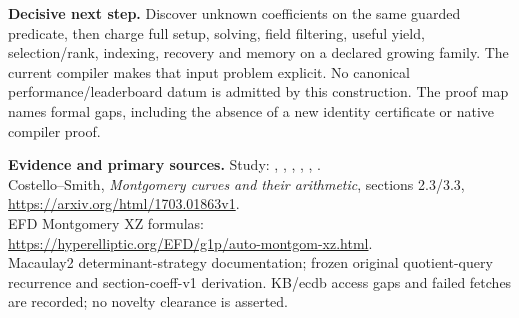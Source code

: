 \documentclass[10pt,a4paper]{article}
\begin{document}
\textbf{Decisive next step.}
Discover unknown coefficients on the same guarded predicate, then charge full
setup, solving, field filtering, useful yield, selection/rank, indexing,
recovery and memory on a declared growing family. The current compiler makes
that input problem explicit. No canonical performance/leaderboard datum is
admitted by this construction. The proof map names formal gaps, including the
absence of a new identity certificate or native compiler proof.

{\small\sloppy\textbf{Evidence and primary sources.}
Study: , ,
, ,
, .\\
Costello--Smith, \emph{Montgomery curves and their arithmetic}, sections 2.3/3.3,
\url{https://arxiv.org/html/1703.01863v1}.\\
EFD Montgomery XZ formulas:\\
\url{https://hyperelliptic.org/EFD/g1p/auto-montgom-xz.html}.\\
Macaulay2 determinant-strategy documentation; frozen original quotient-query
recurrence and section-coeff-v1 derivation. KB/ecdb access gaps and failed
fetches are recorded; no novelty clearance is asserted.}
\end{document}
